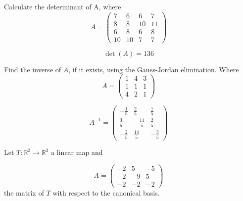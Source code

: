 \begin{questions}

\question Calculate the determinant of A, where
$$
A=\left(\begin{array}{rrrr}
7 & 6 & 6 & 7 \\
8 & 8 & 10 & 11 \\
6 & 8 & 6 & 8 \\
10 & 10 & 7 & 7
\end{array}\right)
$$

\begin{solution}
$$\det(A)=136$$
\end{solution}

\question Find the inverse of $A$, if it exists, using the Gauss-Jordan elimination. Where
$$
A=\left(\begin{array}{rrr}
1 & 4 & 3 \\
1 & 1 & 1 \\
4 & 2 & 1
\end{array}\right)
$$

\begin{solution}
$$A^{-1}=\left(\begin{array}{rrr}
-\frac{1}{5} & \frac{2}{5} & \frac{1}{5} \\
\frac{3}{5} & -\frac{11}{5} & \frac{2}{5} \\
-\frac{2}{5} & \frac{14}{5} & -\frac{3}{5}
\end{array}\right)$$
\end{solution}

\question Let $T:\mathbb{R}^3\rightarrow\mathbb{R}^3$  a linear map and
 
$$
A=\left(\begin{array}{rrr}
-2 & 5 & -5 \\
-2 & -9 & 5 \\
-2 & -2 & -2
\end{array}\right)
$$
the matrix of $T$ with respect to the canonical basis.
\end{questions}
